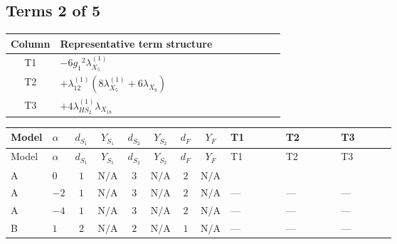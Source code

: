\documentclass[8pt]{article}
\begin{document}
\begin{landscape}
\subsection*{Terms 2 of 5}
\begin{center}
\begin{tabular}{@{}c >{\raggedright\arraybackslash}p{0.82\linewidth}@{}}
\toprule
Column & Representative term structure \\
\midrule
T1 & \(\displaystyle -6 {g_1}^2 {\lambda_{X_{5}}^{(1)}}\) \\
\midrule
T2 & \(\displaystyle +{\lambda_{12}^{(1)}} (8 {\lambda_{X_{5}}^{(1)}}+6 {\lambda_{X_{9}}})\) \\
\midrule
T3 & \(\displaystyle +4 {\lambda_{HS_2}^{(1)}} {\lambda_{X_{18}}}\) \\
\midrule
\bottomrule
\end{tabular}
\end{center}
\smallskip
\tiny
\begin{longtable}{@{}llcccccc >{\raggedright\arraybackslash}p{0.21\linewidth} >{\raggedright\arraybackslash}p{0.21\linewidth} >{\raggedright\arraybackslash}p{0.21\linewidth}@{}}
\toprule
Model & $\alpha$ & $d_{S_1}$ & $Y_{S_1}$ & $d_{S_2}$ & $Y_{S_2}$ & $d_F$ & $Y_F$ & T1 & T2 & T3 \\
\midrule
\endfirsthead
\toprule
Model & $\alpha$ & $d_{S_1}$ & $Y_{S_1}$ & $d_{S_2}$ & $Y_{S_2}$ & $d_F$ & $Y_F$ & T1 & T2 & T3 \\
\midrule
\endhead
A & $0$ & $1$ & $\text{N/A}$ & $3$ & $\text{N/A}$ & $2$ & $\text{N/A}$ & \scriptsize\adjustbox{max width=\linewidth}{$\begin{gathered} -6 {g_1}^2 {\lambda_{X_{5}}^{(1)}}\end{gathered}$} & \scriptsize\adjustbox{max width=\linewidth}{$\begin{gathered} +{\lambda_{12}^{(1)}} (8 {\lambda_{X_{5}}^{(1)}}+6 {\lambda_{X_{9}}})\end{gathered}$} & \scriptsize\adjustbox{max width=\linewidth}{$\begin{gathered} +4 {\lambda_{HS_2}^{(1)}} {\lambda_{X_{18}}}\end{gathered}$} \\
\midrule
A & $-2$ & $1$ & $\text{N/A}$ & $3$ & $\text{N/A}$ & $2$ & $\text{N/A}$ & --- & --- & --- \\
\midrule
A & $-4$ & $1$ & $\text{N/A}$ & $3$ & $\text{N/A}$ & $2$ & $\text{N/A}$ & --- & --- & --- \\
\midrule
B & $1$ & $2$ & $\text{N/A}$ & $2$ & $\text{N/A}$ & $1$ & $\text{N/A}$ & --- & --- & --- \\

\end{longtable}
\end{landscape}
\end{document}
